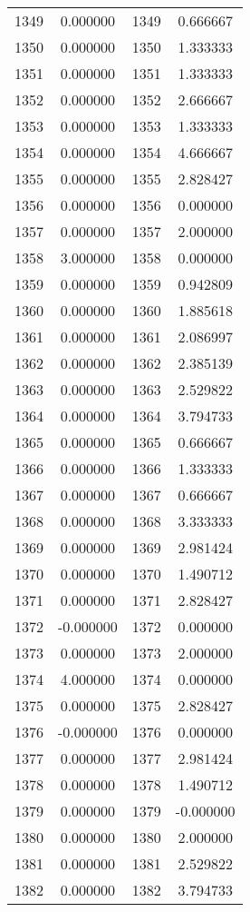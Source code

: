 \documentclass[12pt]{article}
\begin{document}
\begin{longtable}{@{}cccc@{}}
1349 & 0.000000 & 1349 & 0.666667 \\
1350 & 0.000000 & 1350 & 1.333333 \\
1351 & 0.000000 & 1351 & 1.333333 \\
1352 & 0.000000 & 1352 & 2.666667 \\
1353 & 0.000000 & 1353 & 1.333333 \\
1354 & 0.000000 & 1354 & 4.666667 \\
1355 & 0.000000 & 1355 & 2.828427 \\
1356 & 0.000000 & 1356 & 0.000000 \\
1357 & 0.000000 & 1357 & 2.000000 \\
1358 & 3.000000 & 1358 & 0.000000 \\
1359 & 0.000000 & 1359 & 0.942809 \\
1360 & 0.000000 & 1360 & 1.885618 \\
1361 & 0.000000 & 1361 & 2.086997 \\
1362 & 0.000000 & 1362 & 2.385139 \\
1363 & 0.000000 & 1363 & 2.529822 \\
1364 & 0.000000 & 1364 & 3.794733 \\
1365 & 0.000000 & 1365 & 0.666667 \\
1366 & 0.000000 & 1366 & 1.333333 \\
1367 & 0.000000 & 1367 & 0.666667 \\
1368 & 0.000000 & 1368 & 3.333333 \\
1369 & 0.000000 & 1369 & 2.981424 \\
1370 & 0.000000 & 1370 & 1.490712 \\
1371 & 0.000000 & 1371 & 2.828427 \\
1372 & -0.000000 & 1372 & 0.000000 \\
1373 & 0.000000 & 1373 & 2.000000 \\
1374 & 4.000000 & 1374 & 0.000000 \\
1375 & 0.000000 & 1375 & 2.828427 \\
1376 & -0.000000 & 1376 & 0.000000 \\
1377 & 0.000000 & 1377 & 2.981424 \\
1378 & 0.000000 & 1378 & 1.490712 \\
1379 & 0.000000 & 1379 & -0.000000 \\
1380 & 0.000000 & 1380 & 2.000000 \\
1381 & 0.000000 & 1381 & 2.529822 \\
1382 & 0.000000 & 1382 & 3.794733 \\

\end{longtable}
\end{document}

